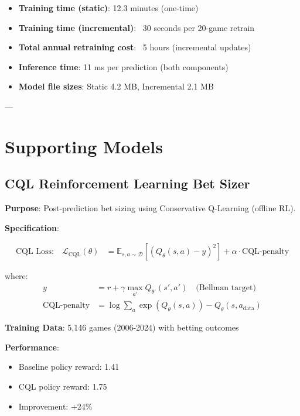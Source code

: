 \begin{itemize}
\item \textbf{Training time (static)}: 12.3 minutes (one-time)
\item \textbf{Training time (incremental)}: ~30 seconds per 20-game retrain
\item \textbf{Total annual retraining cost}: ~5 hours (incremental updates)
\item \textbf{Inference time}: 11 ms per prediction (both components)
\item \textbf{Model file sizes}: Static 4.2 MB, Incremental 2.1 MB
\end{itemize}

---

\section{Supporting Models}

\subsection{CQL Reinforcement Learning Bet Sizer}

\textbf{Purpose}: Post-prediction bet sizing using Conservative Q-Learning (offline RL).

\textbf{Specification}:

\begin{align}
\text{CQL Loss:} \quad \mathcal{L}_{\text{CQL}}(\theta) &= \mathbb{E}_{s,a \sim \mathcal{D}} \left[ \left( Q_\theta(s, a) - y \right)^2 \right] + \alpha \cdot \text{CQL-penalty}
\label{eq:cql-loss}
\end{align}

where:
\begin{align}
y &= r + \gamma \max_{a'} Q_{\theta'}(s', a') \quad \text{(Bellman target)} \\
\text{CQL-penalty} &= \log \sum_{a} \exp(Q_\theta(s, a)) - Q_\theta(s, a_{\text{data}})
\end{align}

\textbf{Training Data}: 5,146 games (2006-2024) with betting outcomes

\textbf{Performance}:
\begin{itemize}
\item Baseline policy reward: 1.41
\item CQL policy reward: 1.75
\item Improvement: +24\%
\end{itemize}

